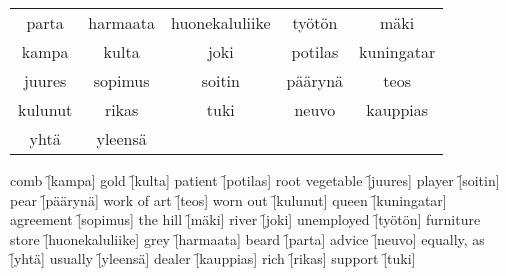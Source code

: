 \begin{center}
  \begin{tabular}{|c c c c c|}
    \hline
    parta & harmaata & huonekaluliike & työtön & mäki \\
    kampa & kulta & joki & potilas & kuningatar \\
    juures & sopimus & soitin & päärynä & teos \\
    kulunut & rikas & tuki & neuvo& kauppias \\
    yhtä & yleensä &&&\\
    \hline
  \end{tabular}
\end{center}

\begin{questions}
  \begin{multicols}{3}
    \raggedcolumns
    \question comb \f[kampa]
    \question gold \f[kulta]
    \question patient \f[potilas]
    \question root vegetable \f[juures]
    \question player \f[soitin]
    \question pear \f[päärynä]
    \question work of art \f[teos]
    \question worn out \f[kulunut]
    \question queen \f[kuningatar]
    \question agreement \f[sopimus]
    \question the hill \f[mäki]
    \question river \f[joki]
    \question unemployed \f[työtön]
    \question furniture store \f[huonekaluliike]
    \question grey  \f[harmaata]
    \question beard \f[parta]
    \question advice \f[neuvo]
    \question equally, as \f[yhtä]
    \question usually \f[yleensä]
    \question dealer \f[kauppias]
    \question rich   \f[rikas]
    \question support \f[tuki]
  \end{multicols}
\end{questions}
